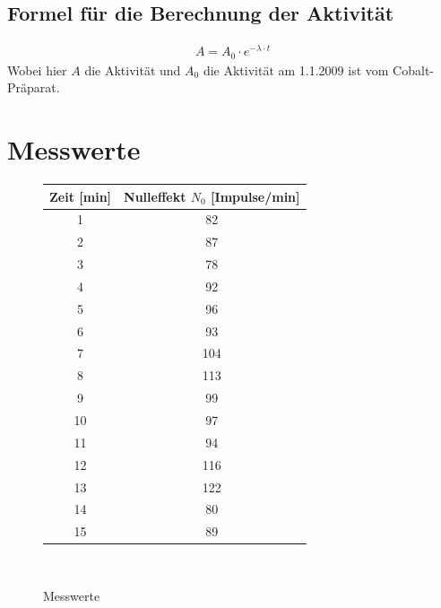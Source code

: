 \documentclass[fontsize=12pt]{scrartcl}
\begin{document}
\subsection{Formel für die Berechnung der Aktivität}
\begin{align}
A= A_0 \cdot e^{-\lambda\cdot t}
\end{align}
\noindent
Wobei hier $A$ die Aktivität und $A_0$ die Aktivität am 1.1.2009 ist vom Cobalt-Präparat.

\section{ Messwerte}
\begin{figure}[h]
\centering
\caption{Messwerte}
\begin{tabular}{|c|c|} \hline
Zeit [min] &	Nulleffekt $N_0$ [Impulse/min] \\ \hline
1	&82 \\ \hline
2	&87 \\ \hline
3	&78 \\ \hline
4	&92 \\ \hline
5	&96 \\ \hline
6	&93 \\ \hline
7	&104 \\ \hline
8	&113 \\ \hline
9	&99 \\ \hline
10	&97 \\ \hline
11		&94 \\ \hline
12	&116 \\ \hline
13	&122 \\ \hline
14	&80 \\ \hline
15	&89 \\ \hline
\end{tabular} \\
\end{figure} 
\noindent
\newpage
\end{document}
